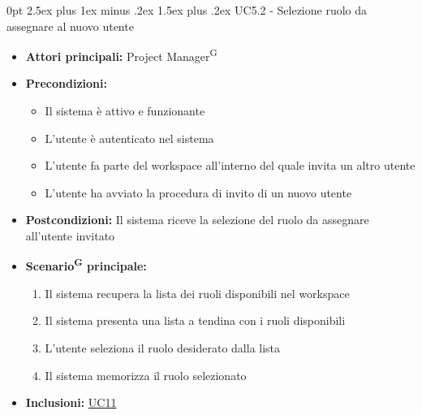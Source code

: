 \documentclass[a4paper, 11pt]{article}
\makeatletter
\renewcommand\paragraph{\@startsection{paragraph}{4}
  {0pt}
  {2.5ex plus 1ex minus .2ex}
  {1.5ex plus .2ex}
  {\normalfont\normalsize\bfseries\color{AccentDark}}}
\makeatother
\begin{document}
\paragraph{UC5.2 - Selezione ruolo da assegnare al nuovo utente}\label{UC5.2}
\begin{itemize}
	\item \textbf{Attori principali:} Project Manager\textsuperscript{G}
	\item \textbf{Precondizioni:}
	\begin{itemize}
		\item Il sistema è attivo e funzionante
		\item L'utente è autenticato nel sistema
        \item L'utente fa parte del workspace all'interno del quale invita un altro utente
        \item L'utente ha avviato la procedura di invito di un nuovo utente
	\end{itemize}
    	\item \textbf{Postcondizioni:} Il sistema riceve la selezione del ruolo da assegnare all'utente invitato
	\item \textbf{Scenario\textsuperscript{G} principale:}
    \begin{enumerate}
    \item Il sistema recupera la lista dei ruoli disponibili nel workspace
    \item Il sistema presenta una lista a tendina con i ruoli disponibili
    \item L'utente seleziona il ruolo desiderato dalla lista
    \item Il sistema memorizza il ruolo selezionato
    \end{enumerate}
    \item \textbf{Inclusioni:} \hyperref[UC11]{UC11}
\end{itemize}
\end{document}
